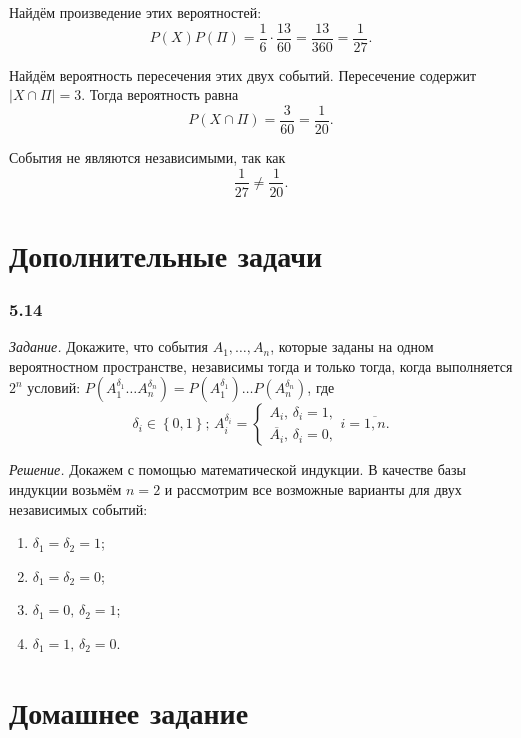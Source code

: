 Найдём произведение этих вероятностей:
$$P \left( X \right) P \left( \Pi \right) =
\frac{1}{6} \cdot \frac{13}{60} =
\frac{13}{360} =
\frac{1}{27}.$$

Найдём вероятность пересечения этих двух событий.
Пересечение содержит $ \left| X \cap \Pi \right| = 3$.
Тогда вероятность равна
$$P \left( X \cap \Pi \right) =
\frac{3}{60} =
\frac{1}{20}.$$

События не являются независимыми, так как
$$ \frac{1}{27} \neq \frac{1}{20}.$$

\section*{Дополнительные задачи}

\subsubsection*{5.14}

\textit{Задание.}
Докажите, что события
$A_1, \dotsc, A_n$,
которые заданы на одном вероятностном пространстве,
независимы тогда и только тогда,
когда выполняется $2^n$ условий:
$P \left( A_1^{ \delta_1} \dotsc A_n^{ \delta_n} \right) =
P \left( A_1^{ \delta_1} \right) \dotsc P \left( A_n^{ \delta_n} \right) $, где
$$ \delta_i \in \left\{ 0, 1 \right\}; \, A_i^{ \delta_i} =
\begin{cases}
A_i, \, \delta_i = 1, \\
\overline{A_i}, \, \delta_i = 0,
\end{cases}
i = \overline{1, n}.$$

\textit{Решение.} Докажем с помощью математической индукции.
В качестве базы индукции возьмём $n = 2$ и рассмотрим все возможные варианты для двух независимых событий:
\begin{enumerate}
\item $ \delta_1 = \delta_2 = 1$;
\item $ \delta_1 = \delta _2 = 0$;
\item $ \delta_1 = 0, \, \delta_2 = 1$;
\item $ \delta_1 = 1, \, \delta_2 = 0$.
\end{enumerate}

\section*{Домашнее задание}

